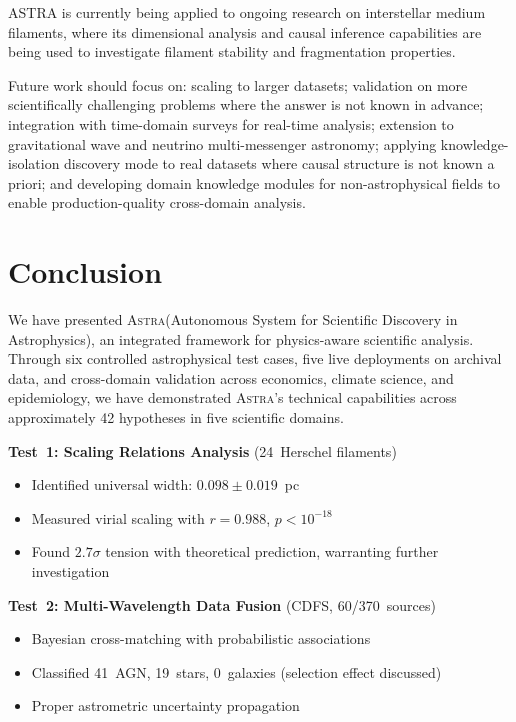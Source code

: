 \documentclass[usenatbib]{rasti}
\newcommand{\astra}{\textsc{Astra}\xspace}
\begin{document}
ASTRA is currently being applied to ongoing research on interstellar medium filaments, where its dimensional analysis and causal inference capabilities are being used to investigate filament stability and fragmentation properties.

Future work should focus on: scaling to larger datasets; validation on more scientifically challenging problems where the answer is not known in advance; integration with time-domain surveys for real-time analysis; extension to gravitational wave and neutrino multi-messenger astronomy; applying knowledge-isolation discovery mode to real datasets where causal structure is not known a priori; and developing domain knowledge modules for non-astrophysical fields to enable production-quality cross-domain analysis.

\section{Conclusion}
\label{sec:conclusion}

We have presented \astra (Autonomous System for Scientific Discovery in Astrophysics), an integrated framework for physics-aware scientific analysis.
Through six controlled astrophysical test cases, five live deployments on archival data, and cross-domain validation across economics, climate science, and epidemiology, we have demonstrated \astra's technical capabilities across approximately 42 hypotheses in five scientific domains.

\textbf{Test~1: Scaling Relations Analysis} (24~Herschel filaments)
\begin{itemize}
  \item Identified universal width: $0.098 \pm 0.019$~pc
  \item Measured virial scaling with $r = 0.988$, $p < 10^{-18}$
  \item Found $2.7\sigma$ tension with theoretical prediction, warranting further investigation
\end{itemize}

\textbf{Test~2: Multi-Wavelength Data Fusion} (CDFS, 60/370~sources)
\begin{itemize}
  \item Bayesian cross-matching with probabilistic associations
  \item Classified 41~AGN, 19~stars, 0~galaxies (selection effect discussed)
  \item Proper astrometric uncertainty propagation
\end{itemize}
\end{document}
